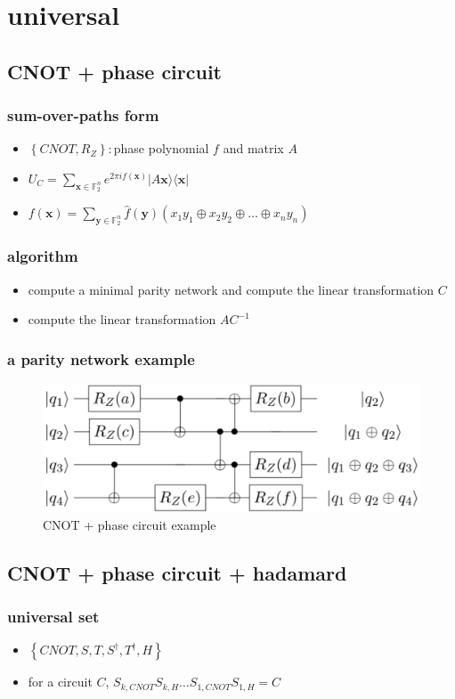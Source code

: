 \section{universal}
\subsection{CNOT + phase circuit}
\begin{frame}
    \frametitle{sum-over-paths form}
    \begin{itemize}
        \item $\left\{CNOT,R_Z\right\} : $phase polynomial $\mathit{f}$ and matrix $A$
        \item $U_{C}=\sum_{\mathbf{x} \in \mathbb{F}_{2}^{n}} e^{2 \pi \mathit{i} \mathit{f}(\mathbf{x})}|A \mathbf{x}\rangle\langle\mathbf{x}|$
        \item $f(\mathbf{x})=\sum_{\mathbf{y} \in \mathbb{F}_{2}^{n}} \hat{f}(\mathbf{y})\left(x_{1} y_{1} \oplus x_{2} y_{2} \oplus \ldots \oplus x_{n} y_{n}\right)$
    \end{itemize}
\end{frame}
\begin{frame}
    \frametitle{algorithm\cite{Patel_2008}}
    \begin{itemize}
        \item compute a minimal parity network and compute the linear transformation $C$
        \item compute the linear transformation $AC^{-1}$
    \end{itemize}
\end{frame}
\begin{frame}
    \frametitle{a parity network example}
    \begin{figure}
        \centering
        \includegraphics[width=.8\linewidth]{figure/parity.png}
        \caption{CNOT + phase circuit example}
    \end{figure}
\end{frame}
\subsection{CNOT + phase circuit + hadamard}
\begin{frame}
    \frametitle{universal set}
    \begin{itemize}
        \item $\left\{CNOT,S,T,S^{\dagger},T^{\dagger},H\right\}$
        \item for a circuit $C$, $S_{k, CNOT} S_{k, H} \ldots S_{1, CNOT} S_{1, H}=C$
    \end{itemize}
\end{frame}
